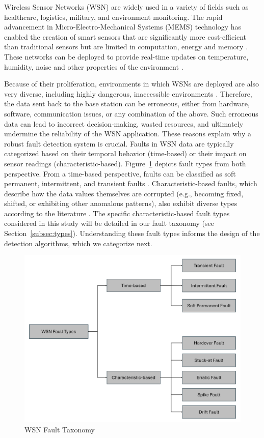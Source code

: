 Wireless Sensor Networks (WSN) are widely used in a variety of fields such as healthcare, logistics, military, and environment monitoring. The rapid advancement in Micro-Electro-Mechanical Systems (MEMS) technology has enabled the creation of smart sensors that are significantly more cost-efficient than traditional sensors but are limited in computation, energy and memory \cite{Yick2008, Chai2020, Hussain2021}. These networks can be deployed to provide real-time updates on temperature, humidity, noise and other properties of the environment \cite{Yick2008, Chai2020, Ullo2020}.

Because of their proliferation, environments in which WSNs are deployed are also very diverse, including highly dangerous, inaccessible environments \cite{Prasad2023}. Therefore, the data sent back to the base station can be erroneous, either from hardware, software, communication issues, or any combination of the above. Such erroneous data can lead to incorrect decision-making, wasted resources, and ultimately undermine the reliability of the WSN application. These reasons explain why a robust fault detection system is crucial. Faults in WSN data are typically categorized based on their temporal behavior (time-based) or their impact on sensor readings (characteristic-based). Figure~\ref{fig:types} depicts fault types from both perspective. From a time-based perspective, faults can be classified as soft permanent, intermittent, and transient faults \cite{Prasad2023}. Characteristic-based faults, which describe how the data values themselves are corrupted (e.g., becoming fixed, shifted, or exhibiting other anomalous patterns), also exhibit diverse types according to the literature \cite{Shi2024, Saeed2021, Ni2009, Hasan2024}. The specific characteristic-based fault types considered in this study will be detailed in our fault taxonomy (see Section~\ref{subsec:types}). Understanding these fault types informs the design of the detection algorithms, which we categorize next.

\begin{figure}
  \centering
  \includegraphics[width=\linewidth]{images/fault_taxonomy.png}
  \caption{WSN Fault Taxonomy}
  \label{fig:types}
\end{figure}

